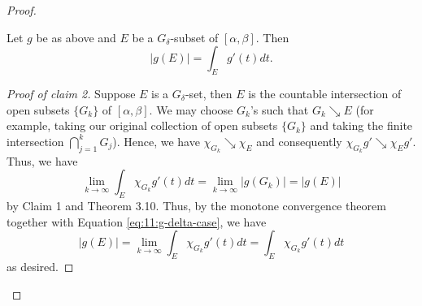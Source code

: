 \begin{proof}
\begin{claim}
Let $g$ be as above and $E$ be a $G_\delta$-subset of
$[\alpha,\beta]$. Then
\[
|g(E)|=\int_E g'(t)dt.
\]
\end{claim}
\begin{proof}[Proof of claim 2]
\renewcommand\qedsymbol{$\clubsuit$}
Suppose $E$ is a $G_\delta$-set, then $E$ is the countable intersection of
open subsets $\{G_k\}$ of $[\alpha,\beta]$. We may choose $G_k$'s such that
$G_k\searrow E$ (for example, taking our original collection of open
subsets $\{G_k\}$ and taking the finite intersection $\bigcap_{j=1}^k
G_j$). Hence, we have $\chi_{G_k}\searrow\chi_E$ and consequently
$\chi_{G_k}g'\searrow\chi_Eg'$. Thus, we have
\begin{equation}
\label{eq:11:g-delta-case}
\lim_{k\to\infty}\int_E\chi_{G_k}g'(t)dt
=\lim_{k\to\infty}|g(G_k)|
=|g(E)|
\end{equation}
by Claim 1 and Theorem 3.10. Thus, by the monotone convergence theorem
together with Equation \eqref{eq:11:g-delta-case}, we have
\begin{equation}
\label{eq:11:apply-mct}
|g(E)|=\lim_{k\to\infty}\int_E\chi_{G_k}g'(t)dt=\int_E\chi_{G_k}g'(t)dt
\end{equation}
as desired.
\end{proof}
\begin{claim}

\end{claim}
\end{proof}
\newpage


